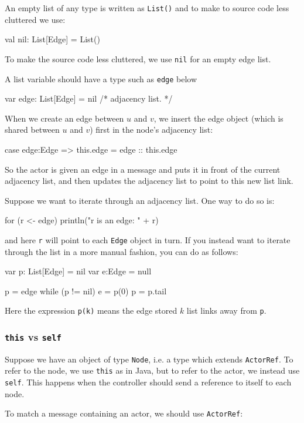 \documentclass{forsete}
\begin{document}
An empty list of any type is written as \verb.List(). and to make to source
code less cluttered we use:
\begin{ccode}
val	nil: List[Edge] = List()
\end{ccode}
To make the source code less cluttered, we use \verb.nil. for an empty edge list.

A list variable should have a type such as \verb.edge. below
\begin{ccode}
var	edge: List[Edge] = nil		/* adjacency list. */
\end{ccode}

When we create an edge between $u$ and $v$, we insert the edge object (which is shared between $u$ and $v$)
first in the node's adjacency list:
\begin{ccode}
case edge:Edge => { this.edge = edge :: this.edge }
\end{ccode}

So the actor is given an edge in a message and puts it in front of the current adjacency list, and
then updates the adjacency list to point to this new list link.

Suppose we want to iterate through an adjacency list. One way to do so is:
\begin{ccode}
for (r <- edge)
	println("r is an edge: " + r)
\end{ccode}
and here \verb.r. will point to each \verb.Edge. object in turn.
If you instead want to iterate through the list in a more manual fashion, you can do as follows:
\begin{ccode}
var	p: List[Edge]	= nil
var	e:Edge		= null

p = edge
while (p != nil) {
	e = p(0)
	p = p.tail
}
\end{ccode}

Here the expression \verb.p(k). means the edge stored $k$ list links away from \verb.p..

\subsubsection*{{\tt this} vs {\tt self}}

Suppose we have an object of type \verb.Node., i.e. a type which extends \verb.ActorRef..
To refer to the node, we use {\tt this} as in Java, but to refer to the actor, 
we instead use {\tt self}. This happens when the controller should send a reference to itself to
each node.

To match a message containing an actor, we should use \verb.ActorRef.:
\end{document}
